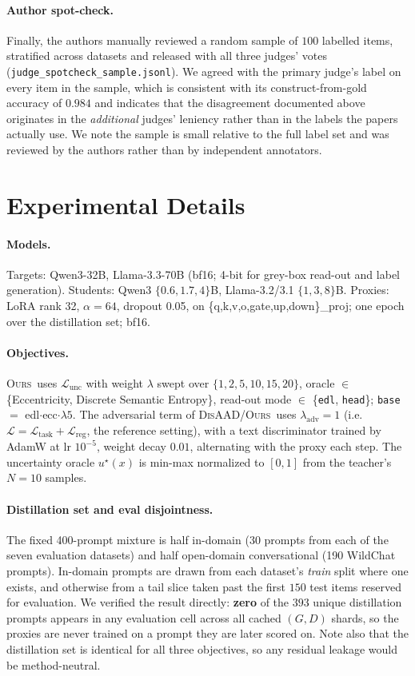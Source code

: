\documentclass[11pt]{article}
\newcommand{\ours}{\textsc{Ours}}
\newcommand{\disaad}{\textsc{DisAAD}}
\begin{document}
\paragraph{Author spot-check.} Finally, the authors manually reviewed a random sample of $100$
labelled items, stratified across datasets and released with all three judges' votes
(\texttt{judge\_spotcheck\_sample.jsonl}). We agreed with the primary judge's label on every
item in the sample, which is consistent with its construct-from-gold accuracy of $0.984$ and
indicates that the disagreement documented above originates in the \emph{additional} judges'
leniency rather than in the labels the papers actually use. We note the sample is small
relative to the full label set and was reviewed by the authors rather than by independent
annotators.

\section{Experimental Details}\label{app:details}
\paragraph{Models.} Targets: Qwen3-32B, Llama-3.3-70B (bf16; 4-bit for grey-box read-out
and label generation). Students: Qwen3 $\{0.6,1.7,4\}$B, Llama-3.2/3.1 $\{1,3,8\}$B.
Proxies: LoRA rank 32, $\alpha{=}64$, dropout 0.05, on
\{q,k,v,o,gate,up,down\}\_proj; one epoch over the distillation set; bf16.
\paragraph{Objectives.} \ours\ uses $\mathcal{L}_{\text{unc}}$ with weight $\lambda$ swept
over $\{1,2,5,10,15,20\}$, oracle $\in$ \{Eccentricity, Discrete Semantic Entropy\},
read-out mode $\in$ \{\texttt{edl}, \texttt{head}\}; \texttt{base} $=$ edl$\cdot$ecc$\cdot
\lambda5$. The adversarial term of \disaad/\ours\ uses $\lambda_{\text{adv}}{=}1$ (i.e.\
$\mathcal{L}=\mathcal{L}_{\text{task}}+\mathcal{L}_{\text{reg}}$, the reference setting), with a
text discriminator trained by AdamW at lr $10^{-5}$, weight decay $0.01$, alternating with the
proxy each step. The uncertainty oracle $u^\star(x)$ is min-max normalized to $[0,1]$ from the
teacher's $N{=}10$ samples.
\paragraph{Distillation set and eval disjointness.} The fixed 400-prompt mixture is half
in-domain (30 prompts from each of the seven evaluation datasets) and half open-domain
conversational (190 WildChat prompts). In-domain prompts are drawn from each dataset's
\emph{train} split where one exists, and otherwise from a tail slice taken past the first
$150$ test items reserved for evaluation. We verified the result directly: \textbf{zero} of
the $393$ unique distillation prompts appears in any evaluation cell across all cached
$(G,D)$ shards, so the proxies are never trained on a prompt they are later scored on. Note
also that the distillation set is identical for all three objectives, so any residual leakage
would be method-neutral.
\end{document}
